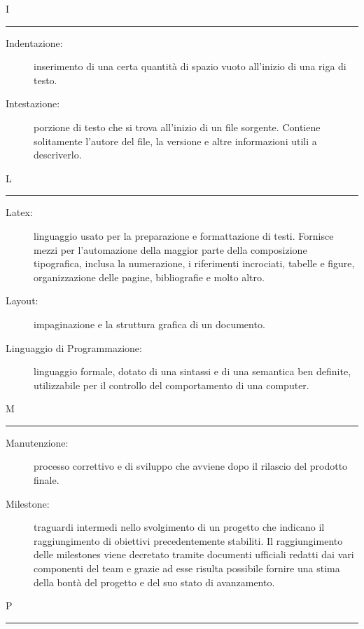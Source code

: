 \documentclass[11pt,a4paper]{article}
\begin{document}
\bigskip
\Huge I \bigskip
\hrule
\smallskip
\normalsize
\begin{description}
	\item[Indentazione:] inserimento di una certa quantità di spazio vuoto all'inizio di una riga di testo.
	\item[Intestazione:] porzione di testo che si trova all'inizio di un file sorgente. Contiene solitamente l'autore del file, la versione e altre informazioni utili a descriverlo.
\end{description}
\bigskip
\Huge L \bigskip
\hrule
\smallskip
\normalsize
\begin{description}
	\item[Latex:] linguaggio usato per la preparazione e formattazione di testi. Fornisce mezzi per l'automazione della maggior parte della composizione tipografica, inclusa la numerazione, i riferimenti incrociati, tabelle e figure, organizzazione delle pagine, bibliografie e molto altro.
	\item[Layout:] impaginazione e la struttura grafica di un documento.
	\item[Linguaggio di Programmazione:] linguaggio formale, dotato di una sintassi e di una semantica ben definite, utilizzabile per il controllo del comportamento di una computer.
\end{description}
\bigskip
\Huge M \bigskip
\hrule
\smallskip
\normalsize
\begin{description}
	\item[Manutenzione:] processo correttivo e di sviluppo che avviene dopo il rilascio del prodotto finale.
	\item[Milestone:] traguardi intermedi nello svolgimento di un progetto che indicano il raggiungimento di obiettivi precedentemente stabiliti. Il raggiungimento delle milestones viene decretato tramite documenti ufficiali redatti dai vari componenti del team e grazie ad esse risulta possibile fornire una stima della bontà del progetto e del suo stato di avanzamento.
\end{description}
\bigskip
\Huge P \bigskip
\hrule
\smallskip
\normalsize
\end{document}
